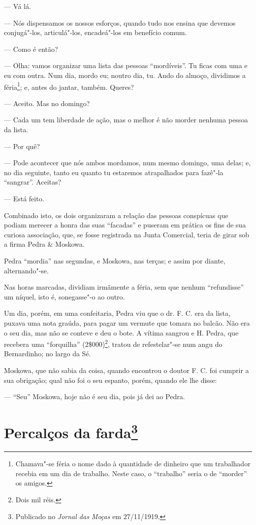 --- Vá lá.

--- Nós dispensamos os nossos esforços, quando tudo nos ensina que
devemos conjugá"-los, articulá"-los, encadeá"-los em benefício comum.

--- Como é então?

--- Olha: vamos organizar uma lista das pessoas ``mordíveis''. Tu ficas
com uma e eu com outra. Num dia, mordo eu; noutro dia, tu. Ando do
almoço, dividimos a féria\footnote{Chamava"-se féria o nome dado à
  quantidade de dinheiro que um trabalhador recebia em um dia de
  trabalho. Neste caso, o ``trabalho'' seria o de ``morder'' os amigos.};
e, antes do jantar, também. Queres?

--- Aceito. Mas no domingo?

--- Cada um tem liberdade de ação, mas o melhor é não morder nenhuma
pessoa da lista.

--- Por quê?

--- Pode acontecer que nós ambos mordamos, num mesmo domingo, uma delas;
e, no dia seguinte, tanto eu quanto tu estaremos atrapalhados para
fazê"-la ``sangrar''. Aceitas?

--- Está feito.

Combinado isto, os dois organizaram a relação das pessoas conspícuas que
podiam merecer a honra das suas ``facadas'' e puseram em prática os fins
de sua curiosa associação, que, se fosse registrada na Junta Comercial,
teria de girar sob a firma Pedra \& Moskowa.

Pedra ``mordia'' nas segundas, e Moskowa, nas terças; e assim por
diante, alternando"-se.

Nas horas marcadas, dividiam irmãmente a féria, sem que nenhum
``refundisse'' um níquel, isto é, sonegasse"-o ao outro.

Um dia, porém, em uma confeitaria, Pedra viu que o dr. F. C. era da
lista, puxava uma nota graúda, para pagar um vermute que tomara no
balcão. Não era o seu dia, mas não se conteve e deu o bote. A vítima
sangrou e H. Pedra, que recebera uma ``forquilha'' (2\$000)\footnote{Dois
  mil réis.}, tratou de refestelar"-se num angu do Bernardinho; no largo
da Sé.

Moskowa, que não sabia da coisa, quando encontrou o doutor F. C. foi
cumprir a sua obrigação; qual não foi o seu espanto, porém, quando ele
lhe disse:

--- ``Seu'' Moskowa, hoje não é seu dia, pois já dei ao Pedra.



\chapter[Percalços da farda]{Percalços da farda\footnote[*]{Publicado no \emph{Jornal das Moças} em 27/11/1919.}}

